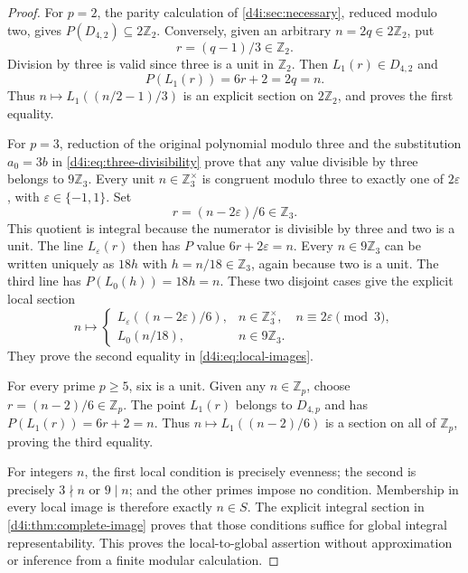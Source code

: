 \begin{proof}
For $p=2$, the parity calculation of \cref{d4i:sec:necessary}, reduced
modulo two, gives $P(D_{4,2})\subseteq2\mathbb Z_2$. Conversely,
given an arbitrary $n=2q\in2\mathbb Z_2$, put
\[
 r=(q-1)/3\in\mathbb Z_2.
\]
Division by three is valid since three is a unit in $\mathbb Z_2$.
Then $L_1(r)\in D_{4,2}$ and
\[
                         P(L_1(r))=6r+2=2q=n.
\]
Thus $n\mapsto L_1((n/2-1)/3)$ is an explicit section on
$2\mathbb Z_2$, and proves the first equality.

For $p=3$, reduction of the original polynomial modulo three and
the substitution $a_0=3b$ in
\eqref{d4i:eq:three-divisibility} prove that any value divisible by
three belongs to $9\mathbb Z_3$. Every unit
$n\in\mathbb Z_3^{\times}$ is congruent modulo three to exactly
one of $2\varepsilon$, with $\varepsilon\in\{-1,1\}$. Set
\[
 r=(n-2\varepsilon)/6\in\mathbb Z_3.
\]
This quotient is integral because the numerator is divisible by
three and two is a unit. The line $L_\varepsilon(r)$ then has
$P$ value $6r+2\varepsilon=n$.
Every $n\in9\mathbb Z_3$ can be written uniquely as $18h$ with
$h=n/18\in\mathbb Z_3$, again because two is a unit.
The third line has $P(L_0(h))=18h=n$. These two disjoint cases
give the explicit local section
\[
 n\longmapsto
 \begin{cases}
 L_\varepsilon((n-2\varepsilon)/6),
        &n\in\mathbb Z_3^{\times},\quad n\equiv2\varepsilon\pmod3,\\
 L_0(n/18),&n\in9\mathbb Z_3.
 \end{cases}
 \label{d4i:eq:three-adic-section}\tag{D4I22}
\]
They prove the second equality in \eqref{d4i:eq:local-images}.

For every prime $p\ge5$, six is a unit. Given any
$n\in\mathbb Z_p$, choose $r=(n-2)/6\in\mathbb Z_p$.
The point $L_1(r)$ belongs to $D_{4,p}$ and has
$P(L_1(r))=6r+2=n$. Thus $n\mapsto L_1((n-2)/6)$ is a
section on all of $\mathbb Z_p$, proving the third equality.

For integers $n$, the first local condition is precisely evenness;
the second is precisely $3\nmid n$ or $9\mid n$; and the other
primes impose no condition. Membership in every local image is
therefore exactly $n\in S$. The explicit integral section in
\cref{d4i:thm:complete-image} proves that those conditions suffice
for global integral representability. This proves the local-to-global
assertion without approximation or inference from a finite modular
calculation.
\end{proof}

